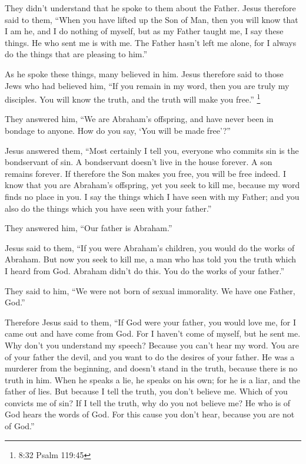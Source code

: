  They didn't understand that he spoke to them about the
Father.  Jesus therefore said to them, ``When you have
lifted up the Son of Man, then you will know that I am he, and I do
nothing of myself, but as my Father taught me, I say these things.
 He who sent me is with me. The Father hasn't left me
alone, for I always do the things that are pleasing to him.''

 As he spoke these things, many believed in him.
 Jesus therefore said to those Jews who had believed him,
``If you remain in my word, then you are truly my disciples.
 You will know the truth, and the truth will make you
free.'' \footnote{8:32 Psalm 119:45}

 They answered him, ``We are Abraham's offspring, and have
never been in bondage to anyone. How do you say, `You will be made
free'?''

 Jesus answered them, ``Most certainly I tell you, everyone
who commits sin is the bondservant of sin.  A bondservant
doesn't live in the house forever. A son remains forever. 
If therefore the Son makes you free, you will be free indeed.
 I know that you are Abraham's offspring, yet you seek to
kill me, because my word finds no place in you.  I say the
things which I have seen with my Father; and you also do the things
which you have seen with your father.''

 They answered him, ``Our father is Abraham.''

Jesus said to them, ``If you were Abraham's children, you would do the
works of Abraham.  But now you seek to kill me, a man who
has told you the truth which I heard from God. Abraham didn't do this.
 You do the works of your father.''

They said to him, ``We were not born of sexual immorality. We have one
Father, God.''

 Therefore Jesus said to them, ``If God were your father,
you would love me, for I came out and have come from God. For I haven't
come of myself, but he sent me.  Why don't you understand
my speech? Because you can't hear my word.  You are of your
father the devil, and you want to do the desires of your father. He was
a murderer from the beginning, and doesn't stand in the truth, because
there is no truth in him. When he speaks a lie, he speaks on his own;
for he is a liar, and the father of lies.  But because I
tell the truth, you don't believe me.  Which of you
convicts me of sin? If I tell the truth, why do you not believe me?
 He who is of God hears the words of God. For this cause
you don't hear, because you are not of God.''

